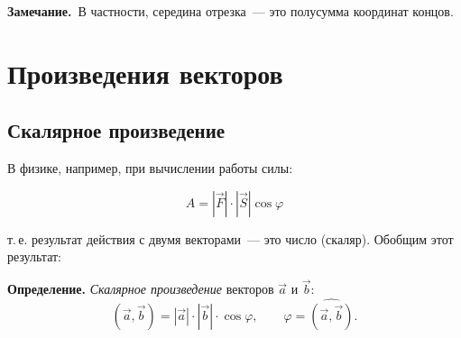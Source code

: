 \documentclass[a4paper,11pt]{article}
\newcommand{\zam}{\textbf{Замечание.}\ }
\begin{document}
\zam В частности, середина отрезка~--- это полусумма координат концов.

\section{Произведения векторов}
\subsection{Скалярное произведение}
В физике, например, при вычислении работы силы:
\begin{center}
\begin{minipage}[c]{0.35\linewidth}
\[A=|\vec F|\cdot|\vec S|\cos\varphi\]
\end{minipage}
\begin{minipage}[c]{0.3\linewidth}
\centering
{}
\end{minipage}
\end{center}
т.\,е. результат действия с двумя векторами~--- это число (скаляр). Обобщим этот результат:
\begin{opr}
\textbf{Определение.} \emph{Скалярное произведение} векторов $\vec a$ и $\vec b$:
\[
(\vec a,\vec b)=|\vec a|\cdot|\vec b|\cdot\cos\varphi,\qquad \varphi=\widehat{(\vec a,\vec b)}.
\]
\end{opr}
\end{document}
